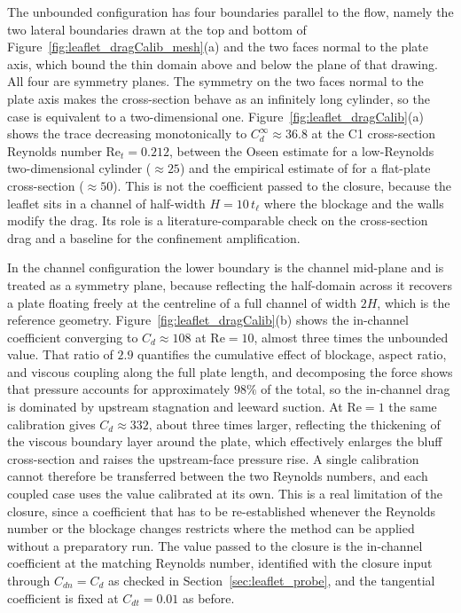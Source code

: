 \noindent
The unbounded configuration has four boundaries parallel to the flow, namely the two lateral boundaries drawn at the top and bottom of Figure~\ref{fig:leaflet_dragCalib_mesh}(a) and the two faces normal to the plate axis, which bound the thin domain above and below the plane of that drawing. All four are symmetry planes. The symmetry on the two faces normal to the plate axis makes the cross-section behave as an infinitely long cylinder, so the case is equivalent to a two-dimensional one. Figure~\ref{fig:leaflet_dragCalib}(a) shows the trace decreasing monotonically to $C_{d}^{\infty} \approx 36.8$ at the C1 cross-section Reynolds number $\mathrm{Re}_{t} = 0.212$, between the Oseen estimate \citep{lamb_hydrodynamics_1932} for a low-Reynolds two-dimensional cylinder ($\approx 25$) and the empirical estimate of \citet{hoerner_fluid_1965} for a flat-plate cross-section ($\approx 50$). This is not the coefficient passed to the closure, because the leaflet sits in a channel of half-width $H = 10\,t_{\ell}$ where the blockage and the walls modify the drag. Its role is a literature-comparable check on the cross-section drag and a baseline for the confinement amplification.

\noindent
In the channel configuration the lower boundary is the channel mid-plane and is treated as a symmetry plane, because reflecting the half-domain across it recovers a plate floating freely at the centreline of a full channel of width $2H$, which is the reference geometry. Figure~\ref{fig:leaflet_dragCalib}(b) shows the in-channel coefficient converging to $C_{d} \approx 108$ at $\mathrm{Re} = 10$, almost three times the unbounded value. That ratio of $2.9$ quantifies the cumulative effect of blockage, aspect ratio, and viscous coupling along the full plate length, and decomposing the force shows that pressure accounts for approximately $98\%$ of the total, so the in-channel drag is dominated by upstream stagnation and leeward suction. At $\mathrm{Re} = 1$ the same calibration gives $C_{d} \approx 332$, about three times larger, reflecting the thickening of the viscous boundary layer around the plate, which effectively enlarges the bluff cross-section and raises the upstream-face pressure rise. A single calibration cannot therefore be transferred between the two Reynolds numbers, and each coupled case uses the value calibrated at its own. This is a real limitation of the closure, since a coefficient that has to be re-established whenever the Reynolds number or the blockage changes restricts where the method can be applied without a preparatory run. The value passed to the closure is the in-channel coefficient at the matching Reynolds number, identified with the closure input through $C_{dn} = C_{d}$ as checked in Section~\ref{sec:leaflet_probe}, and the tangential coefficient is fixed at $C_{dt} = 0.01$ as before.

